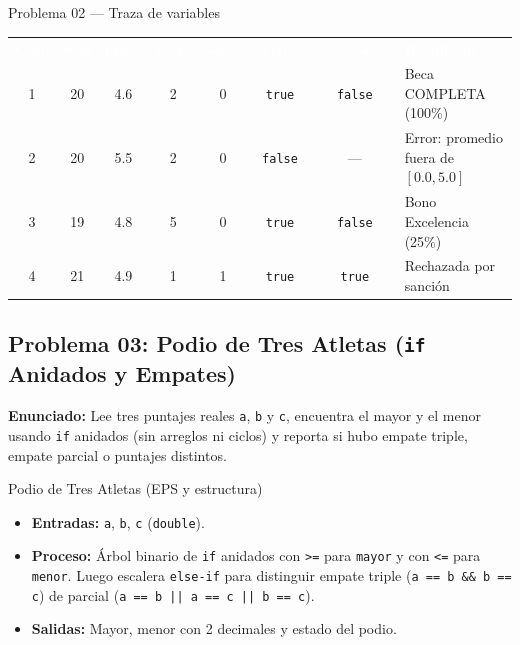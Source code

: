 \documentclass[11pt,letterpaper]{article}
\begin{document}
\begin{pruebaescritorio}{Problema 02 --- Traza de variables}
\footnotesize
\setlength{\tabcolsep}{4pt}
\renewcommand{\arraystretch}{1.22}
\begin{tabularx}{\linewidth}{c c c c c c c X}
  \rowcolor{AzulMarino}
  \textcolor{white}{\textbf{Caso}} & \textcolor{white}{\texttt{edad}} & \textcolor{white}{\texttt{prom.}} & \textcolor{white}{\texttt{estr.}} & \textcolor{white}{\texttt{sanc.}} & \textcolor{white}{\texttt{validos}} & \textcolor{white}{\texttt{tieneSanc.}} & \textcolor{white}{\textbf{Resultado}} \\
  1 & 20 & 4.6 & 2 & 0 & \texttt{true} & \texttt{false} & Beca COMPLETA (100\%) \\
  2 & 20 & 5.5 & 2 & 0 & \texttt{false} & --- & Error: promedio fuera de $[0.0, 5.0]$ \\
  3 & 19 & 4.8 & 5 & 0 & \texttt{true} & \texttt{false} & Bono Excelencia (25\%) \\
  4 & 21 & 4.9 & 1 & 1 & \texttt{true} & \texttt{true} & Rechazada por sanción \\
  \bottomrule
\end{tabularx}
\end{pruebaescritorio}

\subsection{Problema 03: Podio de Tres Atletas (\texorpdfstring{\texttt{if}}{if} Anidados y Empates)}

\textbf{Enunciado:} Lee tres puntajes reales \texttt{a}, \texttt{b} y \texttt{c}, encuentra el mayor y el menor usando \texttt{if} anidados (sin arreglos ni ciclos) y reporta si hubo empate triple, empate parcial o puntajes distintos.

\begin{analisis}{Podio de Tres Atletas (EPS y estructura)}
\begin{itemize}
  \item \textbf{Entradas:} \texttt{a}, \texttt{b}, \texttt{c} (\texttt{double}).
  \item \textbf{Proceso:} Árbol binario de \texttt{if} anidados con \texttt{>=} para \texttt{mayor} y con \texttt{<=} para \texttt{menor}. Luego escalera \texttt{else-if} para distinguir empate triple (\texttt{a == b \&\& b == c}) de parcial (\texttt{a == b || a == c || b == c}).
  \item \textbf{Salidas:} Mayor, menor con 2 decimales y estado del podio.
\end{itemize}
\end{analisis}
\end{document}
